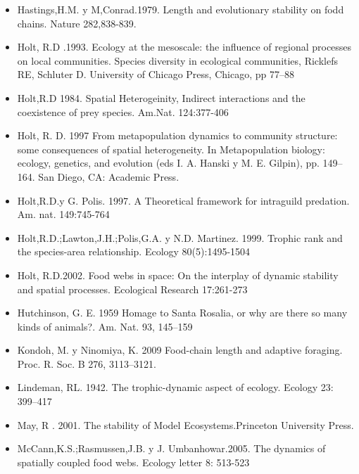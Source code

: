 \documentclass[a4paper,12pt]{article}
\begin{document}
\begin{itemize}
\item[] Hastings,H.M. y M,Conrad.1979. Length and evolutionary stability on fodd chains. Nature 282,838-839.\\
\item[] Holt, R.D .1993. Ecology at the mesoscale: the influence of regional processes on local communities. Species diversity in ecological communities, Ricklefs RE, Schluter D. University of Chicago Press, Chicago, pp 77–88\\
\item[] Holt,R.D 1984. Spatial Heterogeinity, Indirect interactions and the coexistence of prey species. Am.Nat. 124:377-406\\
\item[] Holt, R. D. 1997 From metapopulation dynamics to community structure: some consequences of spatial heterogeneity. In Metapopulation biology: ecology, genetics, and evolution (eds I. A. Hanski y M. E. Gilpin), pp. 149–164. San Diego, CA: Academic Press.\\
\item[] Holt,R.D.y G. Polis. 1997. A Theoretical framework for intraguild predation. Am. nat. 149:745-764\\
\item[] Holt,R.D.;Lawton,J.H.;Polis,G.A. y N.D. Martinez. 1999. Trophic rank and the species-area relationship. Ecology 80(5):1495-1504\\
\item[] Holt, R.D.2002. Food webs in space: On the interplay of dynamic stability and spatial processes. Ecological Research 17:261-273\\
\item[] Hutchinson, G. E. 1959 Homage to Santa Rosalia, or why are there so many kinds of animals?. Am. Nat. 93, 145–159\\
\item[] Kondoh, M. y Ninomiya, K. 2009 Food-chain length and adaptive foraging. Proc. R. Soc. B 276, 3113–3121.\\
\item[] Lindeman, RL. 1942. The trophic-dynamic aspect of ecology. Ecology 23: 399–417\\
\item[] May, R . 2001. The stability of Model Ecosystems.Princeton University Press.\\
\item[] McCann,K.S.;Rasmussen,J.B. y J. Umbanhowar.2005. The dynamics of spatially coupled food webs. Ecology letter 8: 513-523\\

\end{itemize}
\end{document}
